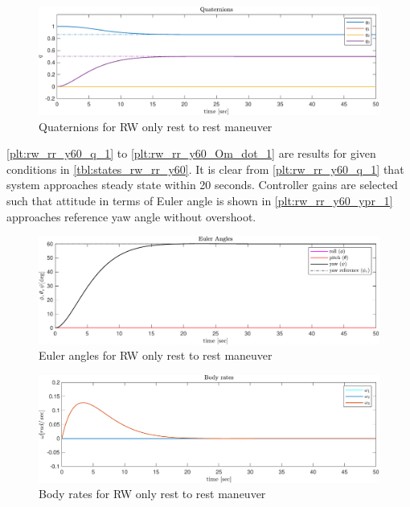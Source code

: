 \begin{figure}[H]
     \centering
    \includegraphics[width=1.0\columnwidth]{figures/plots/RW/rw_rr_y60_q.pdf}
    \caption{Quaternions for RW only rest to rest maneuver}
    \label{plt:rw_rr_y60_q_1}
\end{figure}
\noindent \autoref{plt:rw_rr_y60_q_1} to \autoref{plt:rw_rr_y60_Om_dot_1} are results
for given conditions in \autoref{tbl:states_rw_rr_y60}. It is clear from \autoref{plt:rw_rr_y60_q_1} that system approaches steady state within 20 seconds. Controller gains are selected such that attitude in terms of Euler angle is shown in \autoref{plt:rw_rr_y60_ypr_1} approaches reference yaw angle without overshoot.
\begin{figure}[H]
    \centering
    \includegraphics[width=0.9\columnwidth]{figures/plots/RW/rw_rr_y60_ypr.pdf}
    \caption{Euler angles for RW only rest to rest maneuver}
    \label{plt:rw_rr_y60_ypr_1}
\end{figure}

\begin{figure}[H]
    \centering
    \includegraphics[width=0.9\columnwidth]{figures/plots/RW/rw_rr_y60_w.pdf}
    \caption{Body rates for RW only rest to rest maneuver}
    \label{plt:rw_rr_y60_w_1}
\end{figure}

